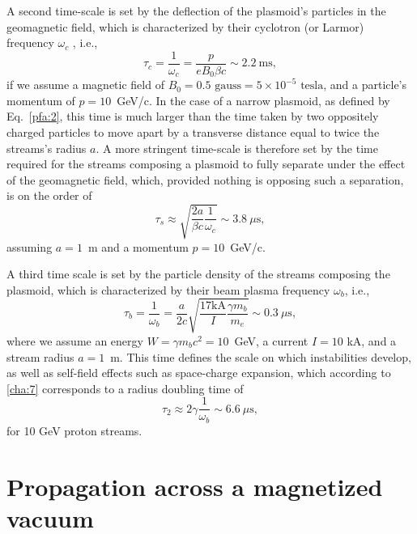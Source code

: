 \documentclass [12pt,a4paper,     ]{report} %
\begin{document}
   A second time-scale is set by the deflection of the plasmoid's particles in the geomagnetic field, which is characterized by their cyclotron (or Larmor) frequency $\omega_c$ , i.e.,
%
\begin{equation}\label{pfa:6} 
    \tau_c = \frac{1}{\omega_c} =  \frac{p}{e B_0 \beta c} \sim 2.2 ~\text{ms},
\end{equation}
%
if we assume a magnetic field of $B_0=0.5 \text{~gauss}=5 \times 10^{-5} \text{~tesla}$, and a particle's momentum of $p=10$~GeV/c.  In the case of a narrow plasmoid, as defined by Eq.\ \eqref{pfa:2}, this time is much larger than the time taken by two oppositely charged particles to move apart by a transverse distance equal to twice the streams's radius $a$. A more stringent time-scale is therefore set by the time required for the streams composing a plasmoid to fully separate under the effect of the geomagnetic field, which, provided nothing is opposing such a separation, is on the order of
%
\begin{equation}\label{pfa:7} 
   \tau_s \approx \sqrt{ \frac{2a}{\beta c} \frac{1}{\omega_c} }
   \sim 3.8~\mu\text{s},
\end{equation}
%
assuming $a=1$~m and a momentum $p=10$~GeV/c.

   A third time scale is set by the particle density of the streams composing the plasmoid,  which is characterized by their beam plasma frequency $\omega_b$, i.e.,
%
\begin{equation}\label{pfa:8} 
    \tau_b = \frac{1}{\omega_b} 
           = \frac{a}{2c} \sqrt{\frac{17\text{kA}}{I} \frac{\gamma m_b}{m_e}}
          \sim 0.3~\mu\text{s},
\end{equation}
%
where we assume an energy $W=\gamma m_b c^2 = 10$~GeV, a current $I = 10$ kA, and a stream radius $a = 1$~m.  This time defines the scale on which   instabilities develop, as well as self-field effects such as space-charge expansion, which according to \eqref{cha:7} corresponds to a radius doubling time of
%
\begin{equation}\label{pfa:9} 
    \tau_2 \approx 2 \gamma \frac{1}{\omega_b}
          \sim 6.6~\mu\text{s},
\end{equation}
%
for 10 GeV proton streams.





\section{Propagation across a magnetized vacuum}
\label{pmv:0}
\end{document}
